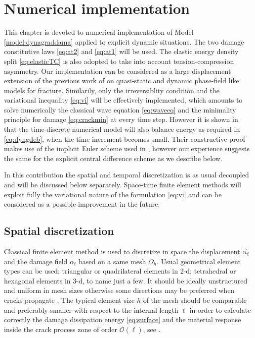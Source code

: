 \chapter{Numerical implementation}
\minitoc

This chapter is devoted to numerical implementation of Model \ref{model:dynagraddama} applied to explicit dynamic situations. The two damage constitutive laws \eqref{eq:at2} and \eqref{eq:at1} will be used. The elastic energy density split \eqref{eq:elasticTC} is also adopted to take into account tension-compression asymmetry. Our implementation can be considered as a large displacement extension of the previous work of \cite{PhamAmorMarigoMaurini:2011,Bourdin:2011,BordenVerhooselScottHughesLandis:2012} on quasi-static and dynamic phase-field like models for fracture. Similarily, only the irreversiblity condition and the variational inequality \eqref{eq:vi} will be effectively implemented, which amounts to solve numerically the classical wave equation \eqref{eq:waveeq} and the minimality principle for damage \eqref{eq:crackmin} at every time step. However it is shown in \cite{LarsenOrtnerSuli:2010} that the time-discrete numerical model will also balance energy as required in \eqref{eq:dyngdeb}, when the time increment becomes small. Their constructive proof makes use of the implicit Euler scheme used in \cite{Bourdin:2011}, however our experience suggests the same for the explicit central difference scheme as we describe below.

In this contribution the spatial and temporal discretization is as usual decoupled and will be discussed below separately. Space-time finite element methods will exploit fully the variational nature of the formulation \eqref{eq:vi} and can be considered as a possible improvement in the future.

\section{Spatial discretization}
Classical finite element method is used to discretize in space the displacement $\vec{u}_t$ and the damage field $\alpha_t$ based on a same mesh $\Omega_h$. Usual geometrical element types can be used: triangular or quadrilateral elements in 2-d; tetrahedral or hexagonal elements in 3-d, to name just a few. It should be ideally unstructured and uniform in mesh sizes otherwise some directions may be preferred when cracks propagate \cite{PhamAmorMarigoMaurini:2011}. The typical element size $h$ of the mesh should be comparable and preferably smaller with respect to the internal length $\ell$ in order to calculate correctly the damage dissipation energy \eqref{eq:surface} and the material response inside the crack process zone of order $\mathcal{O}(\ell)$, see \cite{BourdinFrancfortMarigo:2008}.

